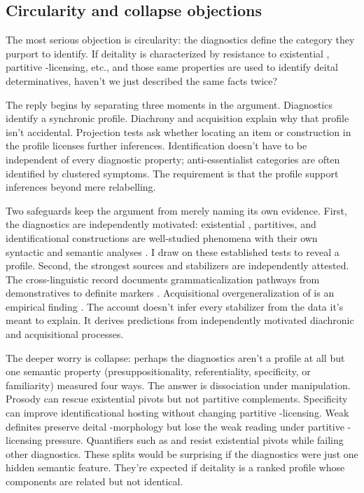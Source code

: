 \documentclass[12pt,letterpaper]{article}
\begin{document}
\subsection{Circularity and collapse objections}

The most serious objection is circularity: the diagnostics define the category they purport to identify. If deitality is characterized by resistance to existential , partitive -licensing, etc., and those same properties are used to identify deital determinatives, haven't we just described the same facts twice?

The reply begins by separating three moments in the argument. Diagnostics identify a synchronic profile. Diachrony and acquisition explain why that profile isn't accidental. Projection tests ask whether locating an item or construction in the profile licenses further inferences. Identification doesn't have to be independent of every diagnostic property; anti-essentialist categories are often identified by clustered symptoms. The requirement is that the profile support inferences beyond mere relabelling.

Two safeguards keep the argument from merely naming its own evidence. First, the diagnostics are independently motivated: existential , partitives, and identificational constructions are well-studied phenomena with their own syntactic and semantic analyses \parencite{milsark1977,Barker1998,Lambrecht1994}. I draw on these established tests to reveal a profile. Second, the strongest sources and stabilizers are independently attested. The cross-linguistic record documents grammaticalization pathways from demonstratives to definite markers \parencite{diessel1999}. Acquisitional overgeneralization of  is an empirical finding \parencite{maratsos1976}. The account doesn't infer every stabilizer from the data it's meant to explain. It derives predictions from independently motivated diachronic and acquisitional processes.

The deeper worry is collapse: perhaps the diagnostics aren't a profile at all but one semantic property (presuppositionality, referentiality, specificity, or familiarity) measured four ways. The answer is dissociation under manipulation. Prosody can rescue existential pivots but not partitive  complements. Specificity can improve identificational hosting without changing partitive -licensing. Weak definites preserve deital -morphology but lose the weak reading under partitive -licensing pressure. Quantifiers such as  and  resist existential pivots while failing other diagnostics. These splits would be surprising if the diagnostics were just one hidden semantic feature. They're expected if deitality is a ranked profile whose components are related but not identical.
\end{document}
